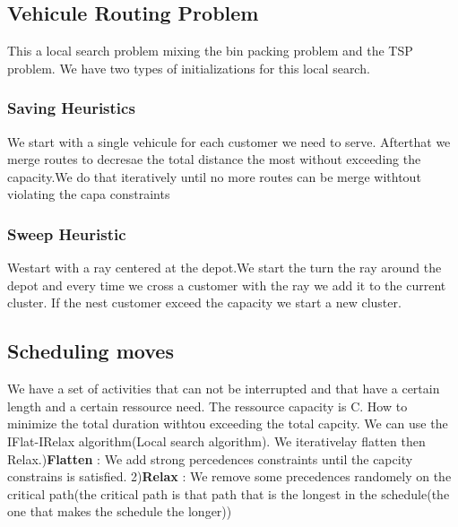 \subsection{Vehicule Routing Problem}
This a local search problem mixing the bin packing problem and the TSP problem.
We have two types of initializations for this local search.

\subsubsection{Saving Heuristics}
We start with a single vehicule for each customer we need to serve.
Afterthat we merge routes to decresae the total distance the most without exceeding the capacity.We do that iteratively until no more routes can be merge withtout violating the capa constraints\newline

\subsubsection{Sweep Heuristic}
Westart with a ray centered at the depot.We start the turn the ray around the depot and every time we cross a customer with the ray we add it to the current cluster. If the nest customer exceed the capacity we start a new cluster.\newline

\subsection{Scheduling moves}
We have a set of activities that can not be interrupted and that have a certain length and a certain ressource need.
The ressource capacity is C.
How to minimize the total duration withtou exceeding the total capcity.\newline
We can use the IFlat-IRelax algorithm(Local search algorithm).\newline
We iterativelay flatten then Relax.)\textbf{Flatten} : We add strong percedences constraints until the capcity constrains is satisfied.
2)\textbf{Relax} : We remove some precedences randomely on the critical
path(the critical path is that path that is the longest in the
schedule(the one that makes the schedule the longer))

